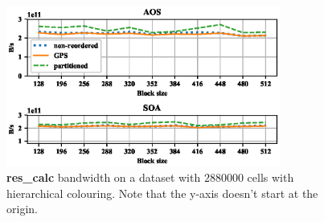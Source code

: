 
\begin{figure}[Htbp]
  \centering
  \includegraphics[width=9cm]{fig/airfoil_bw-vs-bs_hier_large.eps}
  \caption{\textbf{res\_calc} bandwidth on a dataset with $2880000$ cells with
  hierarchical colouring. Note that the y-axis doesn't start at the origin.}
  \label{fig:airfoil_bw-vs-bs_hier_large}
\end{figure}

